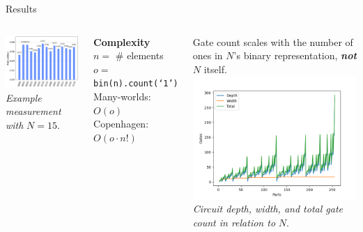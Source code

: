 \documentclass{beamer}
\begin{document}
   \begin{frame}{Results}
       \begin{columns}
           \begin{center}
           \includegraphics[width=\linewidth]{images/example_measurement.png}
           \textit{Example measurement with } $N = 15$. \\%
           \end{center}
           \textbf{Complexity} \\
           $n =$ \# elements \\
           $o =$ \texttt{bin(n).count(`1')} \\
           Many-worlds: $O(o)$ \\
           Copenhagen: $O(o \cdot n!)$
           
           Gate count scales with the number of ones in $N$'s binary representation, \textit{\textbf{not}} $N$ itself.
           \includegraphics[width=\linewidth]{images/resources.png}
           \textit{Circuit depth, width, and total gate count in relation to} $N$.
       \end{columns}
   \end{frame}
   
\end{document}
